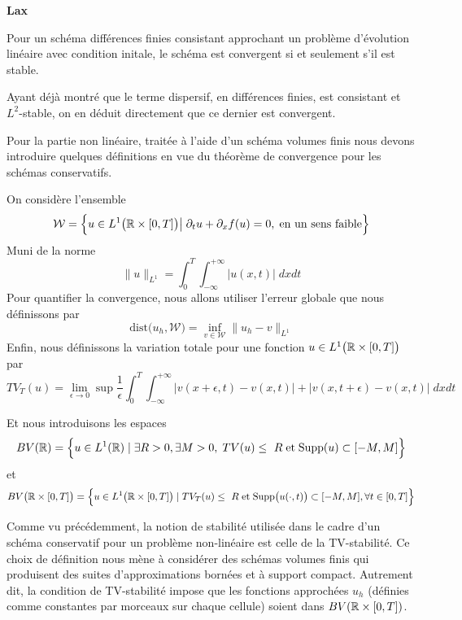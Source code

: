 \begin{theorembox}
\begin{theorem}
    \textbf{Lax}

    Pour un schéma différences finies consistant approchant un problème d'évolution linéaire avec condition initale, le schéma est convergent si et seulement s'il est stable.
\end{theorem}
\end{theorembox}

Ayant déjà montré que le terme dispersif, en différences finies, est consistant et $L^2$-stable, on en déduit directement que ce dernier est convergent.


Pour la partie non linéaire, traitée à l'aide d'un schéma volumes finis nous devons introduire quelques définitions en vue du théorème de convergence pour les schémas conservatifs.


\vspace{1em}

On considère l'ensemble 
$$\mathcal{W} = \Bigl\{ u \in L^1\big(\mathbb{R} \times [0,T]\big) \big| \; \partial_t u + \partial_x f(u) =0, \; \text{en un sens faible} \Bigr\}$$
Muni de la norme 
$$\| u\|_{L^1} = \int_{0}^{T} \int_{-\infty}^{+\infty} |u(x,t)| \; dxdt $$
Pour quantifier la convergence, nous allons utiliser l'erreur globale que nous définissons par 
$$\text{dist}\big(u_h,\mathcal{W}\big) = \underset{v \in \mathcal{W}}{\inf} \| u_h - v \|_{L^1}$$
Enfin, nous définissons la variation totale pour une fonction $u \in L^1\bigl( \mathbb{R} \times [0,T] \bigr)$ par 
$$TV_T(u) = \underset{\epsilon \rightarrow 0}{\lim}\sup \frac{1}{\epsilon} \int_{0}^{T}\int_{-\infty}^{+\infty} |v(x+ \epsilon,t) - v(x,t)| + |v(x,t+\epsilon) - v(x,t)| \; dx dt $$

Et nous introduisons les espaces
$$BV(\mathbb{R}) = \Bigl\{ u \in L^1(\mathbb{R}) \; | \; \exists R > 0, \exists M >0, \; TV(u) \leq \ R \; \text{et} \; \text{Supp}(u) \subset [-M,M] \Bigr\}$$
et
$$BV\bigl(\mathbb{R} \times [0,T]\bigr) = \Bigl\{ u \in L^1\bigl(\mathbb{R} \times [0,T]\bigr) \; | \; TV_T(u) \leq \ R \; \text{et} \; \text{Supp}\bigl(u(\cdot,t)\bigr) \subset [-M,M], \forall t \in [0,T] \Bigr\}$$

Comme vu précédemment, la notion de stabilité utilisée dans le cadre d'un schéma conservatif pour un problème non-linéaire est celle de la TV-stabilité. Ce choix de définition nous mène à considérer des schémas volumes finis qui produisent des suites d'approximations bornées et à support compact. Autrement dit, la condition de TV-stabilité impose que les fonctions approchées $u_h$ (définies comme constantes par morceaux sur chaque cellule) soient dans $BV(\mathbb{R} \times [0,T])$.

